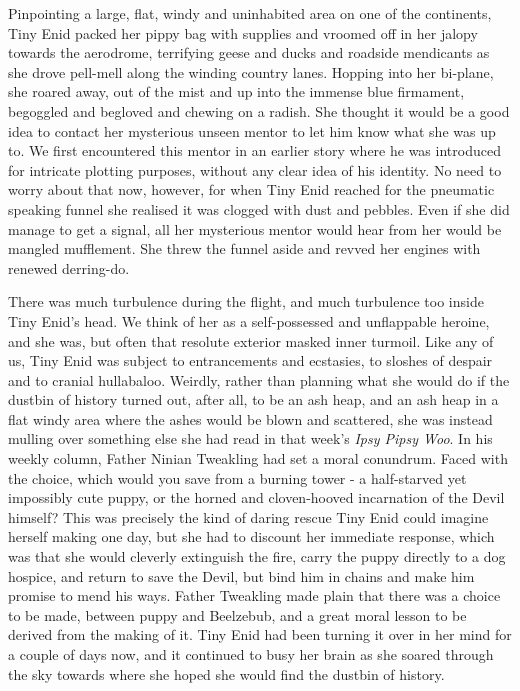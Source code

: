 Pinpointing a large, flat, windy and uninhabited area on one of the continents, Tiny Enid packed her pippy bag with supplies and vroomed off in her jalopy towards the aerodrome, terrifying geese and ducks and roadside mendicants as she drove pell-mell along the winding country lanes. Hopping into her bi-plane, she roared away, out of the mist and up into the immense blue firmament, begoggled and begloved and chewing on a radish. She thought it would be a good idea to contact her mysterious unseen mentor to let him know what she was up to. We first encountered this mentor in an earlier story where he was introduced for intricate plotting purposes, without any clear idea of his identity. No need to worry about that now, however, for when Tiny Enid reached for the pneumatic speaking funnel she realised it was clogged with dust and pebbles. Even if she did manage to get a signal, all her mysterious mentor would hear from her would be mangled mufflement. She threw the funnel aside and revved her engines with renewed derring-do.

There was much turbulence during the flight, and much turbulence too inside Tiny Enid's head. We think of her as a self-possessed and unflappable heroine, and she was, but often that resolute exterior masked inner turmoil. Like any of us, Tiny Enid was subject to entrancements and ecstasies, to sloshes of despair and to cranial hullabaloo. Weirdly, rather than planning what she would do if the dustbin of history turned out, after all, to be an ash heap, and an ash heap in a flat windy area where the ashes would be blown and scattered, she was instead mulling over something else she had read in that week's \emph{Ipsy Pipsy Woo}. In his weekly column, Father Ninian Tweakling had set a moral conundrum. Faced with the choice, which would you save from a burning tower - a half-starved yet impossibly cute puppy, or the horned and cloven-hooved incarnation of the Devil himself? This was precisely the kind of daring rescue Tiny Enid could imagine herself making one day, but she had to discount her immediate response, which was that she would cleverly extinguish the fire, carry the puppy directly to a dog hospice, and return to save the Devil, but bind him in chains and make him promise to mend his ways. Father Tweakling made plain that there was a choice to be made, between puppy and Beelzebub, and a great moral lesson to be derived from the making of it. Tiny Enid had been turning it over in her mind for a couple of days now, and it continued to busy her brain as she soared through the sky towards where she hoped she would find the dustbin of history.

